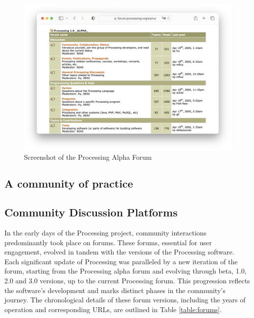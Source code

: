 
\begin{figure}
	\centering
	\includegraphics[width=1.0\textwidth]{images/alpha-browser.png}
	\caption{Screenshot of the Processing Alpha Forum}
	\label{fig:processing-alpha}
\end{figure}

\subsection{A community of practice}



\subsection{Community Discussion Platforms}
In the early days of the Processing project, community interactions predominantly took place on forums. These forums, essential for user engagement, evolved in tandem with the versions of the Processing software. Each significant update of Processing was paralleled by a new iteration of the forum, starting from the Processing alpha forum and evolving through beta, 1.0, 2.0 and 3.0 versions, up to the current Processing forum. This progression reflects the software’s development and marks distinct phases in the community's journey. The chronological details of these forum versions, including the years of operation and corresponding URLs, are outlined in Table \ref{table:forums}. \parencite{ProcessingForum}


